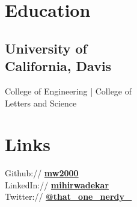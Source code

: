 \documentclass[]{resume-openfont}
\begin{document}
%
%
\lastupdated

%
%


%
%

\begin{minipage}[t]{0.33\textwidth}


\section{Education} 

\subsection{University of \\ California, Davis}
College of Engineering | College of \\ Letters and Science \\
\sectionsep



\section{Links} 
Github:// \href{https://github.com/mw2000}{\bf mw2000} \\
LinkedIn://  \href{https://www.linkedin.com/in/mihirwadekar/}{\bf mihirwadekar} \\
Twitter://  \href{https://twitter.com/that\_one\_nerdy\_}{\bf @that\_one\_nerdy\_} \\
\sectionsep


\end{minipage}
\end{document}
